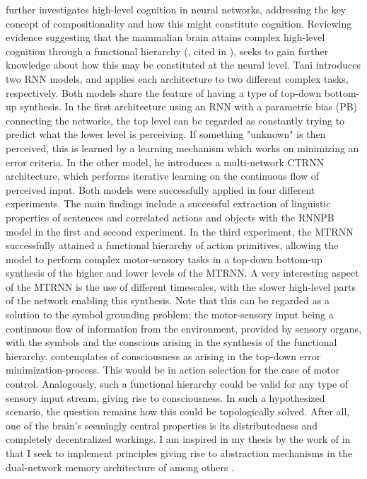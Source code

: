 \cite{Tani2014} further investigates high-level cognition in neural networks, addressing the key concept of compositionality and how this might constitute cognition. Reviewing evidence suggesting that the mammalian brain attains complex high-level cognition through a functional hierarchy (\cite{Miyake2000, Koechlin2003, Fuster2008}, cited in \cite{Tani2014}), \cite{Tani2014} seeks to gain further knowledge about how this may be constituted at the neural level. Tani introduces two RNN models, and applies each architecture to two different complex tasks, respectively. Both models share the feature of having a type of top-down bottom-up synthesis. In the first architecture using an RNN with a parametric bias (PB) connecting the networks, the top level can be regarded as constantly trying to predict what the lower level is perceiving. If something "unknown" is then perceived, this is learned by a learning mechanism which works on minimizing an error criteria. In the other model, he introduces a multi-network CTRNN architecture, which performs iterative learning on the continuous flow of perceived input. Both models were successfully applied in four different experiments. The main findings include a successful extraction of linguistic properties of sentences and correlated actions and objects with the RNNPB model in the first and second experiment. In the third experiment, the MTRNN successfully attained a functional hierarchy of action primitives, allowing the model to perform complex motor-sensory tasks in a top-down bottom-up synthesis of the higher and lower levels of the MTRNN. A very interesting aspect of the MTRNN is the use of different timescales, with the slower high-level parts of the network enabling this synthesis. Note that this can be regarded as a solution to the symbol grounding problem; the motor-sensory input being a continuous flow of information from the environment, provided by sensory organs, with the symbols and the conscious arising in the synthesis of the functional hierarchy. \cite{Tani2014} contemplates of consciousness as arising in the top-down error minimization-process. This would be in action selection for the case of motor control. Analogously, such a functional hierarchy could be valid for any type of sensory input stream, giving rise to consciousness. In such a hypothesized scenario, the question remains how this could be topologically solved. After all, one of the brain's seemingly central properties is its distributedness and completely decentralized workings. I am inspired in my thesis by the work of \cite{Tani2014} in that I seek to implement principles giving rise to abstraction mechanisms in the dual-network memory architecture of among others \cite{Hattori2014}.

